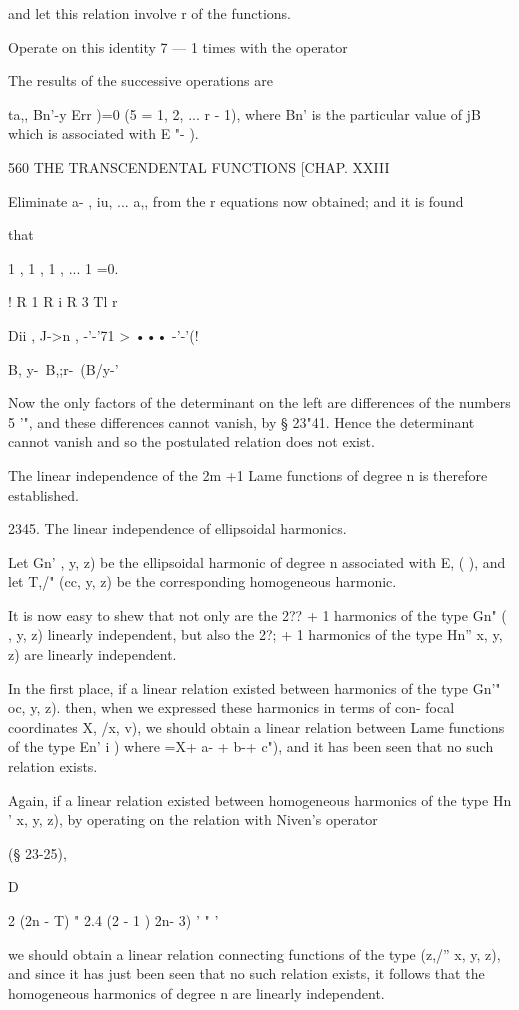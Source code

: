 {{{{{{{and let this relation involve r of the functions.

Operate on this identity 7 — 1 times with the operator

The results of the successive operations are

ta,, Bn'-y Err )=0 (5 = 1, 2, ... r - 1), where Bn' is the particular
value of jB which is associated with E "- ).

560 THE TRANSCENDENTAL FUNCTIONS [CHAP. XXIII

Eliminate a- , iu, ... a,, from the r equations now obtained; and it
is found

that

1 , 1 , 1 , ... 1 =0.

! R 1 R i R 3 Tl r

 Dii , J->n , -'-'71 > ••• -'-'(!

 B, y-\ B,;r-\ (B/y-'

Now the only factors of the determinant on the left are differences of
the numbers 5 '", and these differences cannot vanish, by § 23"41.
Hence the determinant cannot vanish and so the postulated relation
does not exist.

The linear independence of the 2m +1 Lame functions of degree n is
therefore established.

2345. The linear independence of ellipsoidal harmonics.

Let Gn' , y, z) be the ellipsoidal harmonic of degree n associated
with E, ( ), and let T,/" (cc, y, z) be the corresponding homogeneous
harmonic.

It is now easy to shew that not only are the 2?? + 1 harmonics of the
type Gn" ( , y, z) linearly independent, but also the 2?; + 1
harmonics of the type Hn'' x, y, z) are linearly independent.

In the first place, if a linear relation existed between harmonics of
the type Gn'" oc, y, z). then, when we expressed these harmonics in
terms of con- focal coordinates X, /x, v), we should obtain a linear
relation between Lame functions of the type En' i ) where =X+ a- + b-+
c"), and it has been seen that no such relation exists.

Again, if a linear relation existed between homogeneous harmonics of
the type Hn ' x, y, z), by operating on the relation with Niven's
operator

(§ 23-25),

  D\

2 (2n - T) " 2.4 (2 - 1 ) 2n- 3) ' " '

we should obtain a linear relation connecting functions of the type
(z,/'' x, y, z), and since it has just been seen that no such relation
exists, it follows that the homogeneous harmonics of degree n are
linearly independent.

}}}}}}}
